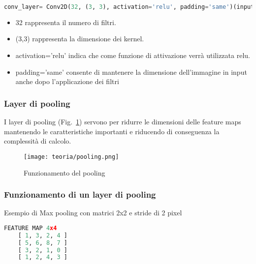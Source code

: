 \begin{lstlisting}[language=Python, frame=none]
    conv_layer= Conv2D(32, (3, 3), activation='relu', padding='same')(input_img)
\end{lstlisting}

\begin{itemize}
    \item 32 rappresenta il numero di filtri.
    \item (3,3) rappresenta la dimensione dei kernel.
    \item activation='relu' indica che come funzione di attivazione verrà utilizzata relu.
    \item padding='same' consente di mantenere la dimensione dell'immagine in input anche dopo l'applicazione dei filtri
\end{itemize}


\subsubsection{Layer di pooling}
I layer di pooling (Fig.~\ref{fig:pooling}) servono per ridurre le dimensioni delle feature maps mantenendo le caratteristiche importanti e riducendo di conseguenza la complessità di calcolo.


\begin{figure}[!h] 
    \centering 
    \texttt{[image: teoria/pooling.png]} 
    \caption{Funzionamento del pooling}
    \label{fig:pooling}
  \end{figure}



\subsubsection{Funzionamento di un layer di pooling}
Esempio di Max pooling con matrici 2x2 e stride di 2 pixel


\begin{lstlisting}[language=Python, frame=none]
    FEATURE MAP 4x4
    [ 1, 3, 2, 4 ]
    [ 5, 6, 8, 7 ]
    [ 3, 2, 1, 0 ]
    [ 1, 2, 4, 3 ]
\end{lstlisting}

